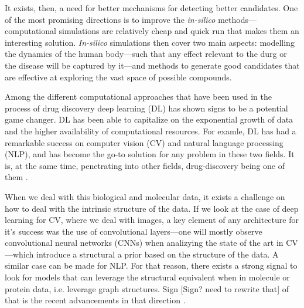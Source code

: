 \documentclass{article}
\begin{document}
It exists, then, a need for better mechanisms for detecting better candidates. One of
 the most promising directions is to improve the \emph{in-silico} methods---computational
 simulations are relatively cheap and quick run that makes them an interesting solution.
 \emph{In-silico} simulations then cover two main aspects: modelling the dynamics of the
 human body---such that any effect relevant to the durg or the disease will be captured
 by it---and methods to generate good candidates that are effective at exploring the
 vast space of possible compounds.





Among the different computational approaches that have been used in the process of drug
 discovery deep learning (DL) has shown signs to be a potential game changer. DL has
 been able to capitalize on the exponential growth of data and the higher availability
 of computational resources. For examle, DL has had a remarkable success on computer
 vision (CV) and natural language processing (NLP), and has become the go-to solution
 for any problem in these two fields. It is, at the same time, penetrating into other
 fields, drug-discovery being one of them \cite{Chen2018}. 

When we deal with this biological and molecular data, it exists a challenge on how to
 deal with the intrinsic structure of the data.
 If we look at the case of deep learning for CV, where we deal with images, a key
 element of any architecture for it's success was the use of convolutional layers---one
 will mostly observe convolutional neural networks (CNNs) when analizying the state of
 the art in CV---which introduce a structural a prior based on the structure of the
 data. A similar case can be made for NLP. For that reason, there exists a strong signal
 to look for models that can leverage the structural equivalent when in molecule or
 protein data, i.e. leverage graph structures. Sign [Sign? need to rewrite that] of that
 is the recent advancements in that direction \cite{Sun2019}.
 
\end{document}

